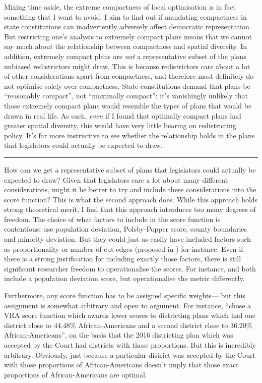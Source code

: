 \documentclass[]{article}
\begin{document}
Mixing time aside, the extreme compactness of local optimisation is in
fact something that I want to avoid. I aim to find out if mandating
compactness in state constitutions can inadvertently adversely affect
democratic representation. But restricting one's analysis to extremely
compact plans means that we cannot say much about the relationship
between compactness and spatial diversity. In addition, extremely
compact plans are \emph{not} a representative subset of the plans
unbiased redistrictors might draw. This is because redistrictors care
about a lot of other considerations apart from compactness, and
therefore most definitely do not optimise solely over compactness. State
constitutions demand that plans be ``reasonably compact'', not
``maximally compact'': it's vanishingly unlikely that those extremely
compact plans would resemble the types of plans that would be drawn in
real life. As such, \emph{even} if I found that optimally compact plans
had greater spatial diversity, this would have very little bearing on
redistricting policy. It's far more instructive to see whether the
relationship holds in the plans that legislators could actually be
expected to draw.

\begin{center}\rule{0.5\linewidth}{\linethickness}\end{center}

How can we get a representative subset of plans that legislators could
actually be expected to draw? Given that legislators care a lot about
many different considerations, might it be better to try and include
these considerations into the score function? This is what the second
approach does. While this approach holds strong theoretical merit, I
find that this approach introduces too many degrees of freedom. The
choice of what factors to include in the score function is contentious:
\citeauthor{h2018} use population deviation, Polsby-Popper score, county
boundaries and minority deviation. But they could just as easily have
included factors such as proportionality or number of cut edges
(proposed in \cite{dc2016}) for instance. Even if there is a strong
justification for including exactly those factors, there is still
significant researcher freedom to operationalise the scores. For
instance, \citeauthor{h2018} and \citeauthor{dd2019va} both include a
population deviation score, but operationalise the metric differently.

Furthermore, any score function has to be assigned specific weights---
but this assignment is somewhat arbitrary and open to argument. For
instance, \citeauthor{h2018} ``chose a VRA score function which awards
lower scores to districting plans which had one district close to
44.48\% African-Americans and a second district close to 36.20\%
African-Americans'', on the basis that the 2016 districting plan which
was accepted by the Court had districts with those proportions. But this
is incredibly arbitrary. Obviously, just because a particular district
was accepted by the Court with those proportions of African-Americans
doesn't imply that those exact proportions of African-Americans are
optimal.
\end{document}
